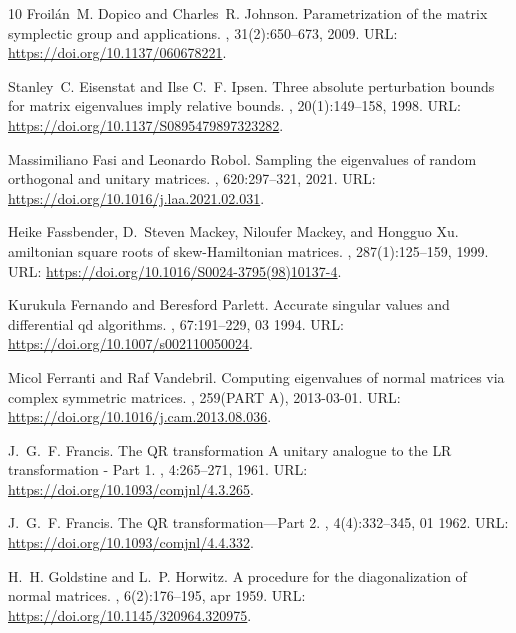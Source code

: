 \documentclass[10pt,twoside,dvipsnames]{siamart1116}
\numberwithin{algorithm}{section}
\numberwithin{equation}{section}
\begin{document}
\begin{thebibliography}{10}
Froil\'{a}n~M. Dopico and Charles~R. Johnson.
\newblock Parametrization of the matrix symplectic group and applications.
,
  31(2):650--673, 2009.
\newblock URL: \url{https://doi.org/10.1137/060678221}.

Stanley~C. Eisenstat and Ilse C.~F. Ipsen.
\newblock Three absolute perturbation bounds for matrix eigenvalues imply
  relative bounds.
,
  20(1):149--158, 1998.
\newblock URL: \url{https://doi.org/10.1137/S0895479897323282}.

Massimiliano Fasi and Leonardo Robol.
\newblock Sampling the eigenvalues of random orthogonal and unitary matrices.
, 620:297--321, 2021.
\newblock URL: \url{https://doi.org/10.1016/j.laa.2021.02.031}.

Heike Fassbender, D.~Steven Mackey, Niloufer Mackey, and Hongguo Xu.
amiltonian square roots of skew-{H}amiltonian matrices.
, 287(1):125--159, 1999.
\newblock URL: \url{https://doi.org/10.1016/S0024-3795(98)10137-4}.

Kurukula Fernando and Beresford Parlett.
\newblock Accurate singular values and differential qd algorithms.
, 67:191--229, 03 1994.
\newblock URL: \url{https://doi.org/10.1007/s002110050024}.

Micol Ferranti and Raf Vandebril.
\newblock Computing eigenvalues of normal matrices via complex symmetric
  matrices.
, 259(PART A),
  2013-03-01.
\newblock URL: \url{https://doi.org/10.1016/j.cam.2013.08.036}.

J.~G.~F. Francis.
\newblock The {QR} transformation {A} unitary analogue to the {LR}
  transformation - {P}art 1.
, 4:265--271, 1961.
\newblock URL: \url{https://doi.org/10.1093/comjnl/4.3.265}.

J.~G.~F. Francis.
\newblock The {QR} transformation—{P}art 2.
, 4(4):332--345, 01 1962.
\newblock URL: \url{https://doi.org/10.1093/comjnl/4.4.332}.

H.~H. Goldstine and L.~P. Horwitz.
\newblock A procedure for the diagonalization of normal matrices.
, 6(2):176–195, apr 1959.
\newblock URL: \url{https://doi.org/10.1145/320964.320975}.


\end{thebibliography}
\end{document}
